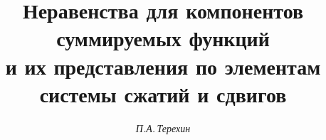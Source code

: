 

 




 


\newcommand{\la}{\langle} 


\newcommand{\ra}{\rangle} 


\newcommand{\supp}{\operatorname{supp}} 


\newcommand{\tts}[1]{} 


 




  


\setcounter{page}{74} 












\author{\it П.А.\,Терехин} 




\title{Неравенства для компонентов суммируемых функций\\


и их представления по элементам\\ системы сжатий и сдвигов} 


 


\date{} 




\pagestyle{plain} %


 




\maketitle 


